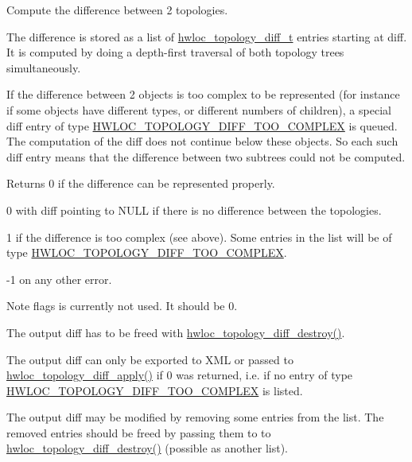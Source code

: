 Compute the difference between 2 topologies. 

The difference is stored as a list of \hyperlink{a00225_ga2cf1b17332fe5d95f2198f6340cfd288}{hwloc\+\_\+topology\+\_\+diff\+\_\+t} entries starting at {\ttfamily diff}. It is computed by doing a depth-\/first traversal of both topology trees simultaneously.

If the difference between 2 objects is too complex to be represented (for instance if some objects have different types, or different numbers of children), a special diff entry of type \hyperlink{a00225_gga38b28b7423b85a3321e6d0062d5f83d0a3dc01fdeff355efe3fb2516bb454a147}{H\+W\+L\+O\+C\+\_\+\+T\+O\+P\+O\+L\+O\+G\+Y\+\_\+\+D\+I\+F\+F\+\_\+\+T\+O\+O\+\_\+\+C\+O\+M\+P\+L\+EX} is queued. The computation of the diff does not continue below these objects. So each such diff entry means that the difference between two subtrees could not be computed.

\begin{DoxyReturn}{Returns}
0 if the difference can be represented properly.

0 with {\ttfamily diff} pointing to N\+U\+LL if there is no difference between the topologies.

1 if the difference is too complex (see above). Some entries in the list will be of type \hyperlink{a00225_gga38b28b7423b85a3321e6d0062d5f83d0a3dc01fdeff355efe3fb2516bb454a147}{H\+W\+L\+O\+C\+\_\+\+T\+O\+P\+O\+L\+O\+G\+Y\+\_\+\+D\+I\+F\+F\+\_\+\+T\+O\+O\+\_\+\+C\+O\+M\+P\+L\+EX}.

-\/1 on any other error.
\end{DoxyReturn}
\begin{DoxyNote}{Note}
{\ttfamily flags} is currently not used. It should be 0.

The output diff has to be freed with \hyperlink{a00225_ga5dcff18f80583ac6505a94ba2877fd1b}{hwloc\+\_\+topology\+\_\+diff\+\_\+destroy()}.

The output diff can only be exported to X\+ML or passed to \hyperlink{a00225_gae7b350d7e7478a4c6047b08aa6544f40}{hwloc\+\_\+topology\+\_\+diff\+\_\+apply()} if 0 was returned, i.\+e. if no entry of type \hyperlink{a00225_gga38b28b7423b85a3321e6d0062d5f83d0a3dc01fdeff355efe3fb2516bb454a147}{H\+W\+L\+O\+C\+\_\+\+T\+O\+P\+O\+L\+O\+G\+Y\+\_\+\+D\+I\+F\+F\+\_\+\+T\+O\+O\+\_\+\+C\+O\+M\+P\+L\+EX} is listed.

The output diff may be modified by removing some entries from the list. The removed entries should be freed by passing them to to \hyperlink{a00225_ga5dcff18f80583ac6505a94ba2877fd1b}{hwloc\+\_\+topology\+\_\+diff\+\_\+destroy()} (possible as another list). 
\end{DoxyNote}
\mbox{\label{a00225_ga5dcff18f80583ac6505a94ba2877fd1b}} 
